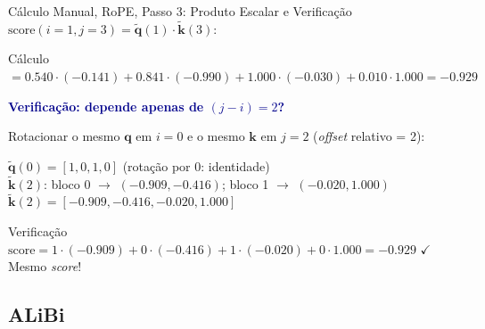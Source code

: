 \documentclass[aspectratio=169, xcolor=dvipsnames]{beamer}
\begin{document}
  \begin{frame}{Cálculo Manual, RoPE, Passo 3: Produto Escalar e Verificação}
    $\text{score}(i{=}1, j{=}3) = \tilde{\mathbf{q}}(1) \cdot \tilde{\mathbf{k}}(3)$:

    \begin{block}{Cálculo}
      $= 0.540 \!\cdot\! ({-}0.141) + 0.841 \!\cdot\! ({-}0.990) + 1.000 \!\cdot\! ({-}0.030) + 0.010 \!\cdot\! 1.000 = \mathbf{-0.929}$
    \end{block}

    \textcolor{DarkBlue}{\textbf{Verificação: depende apenas de $(j - i) = 2$?}}

    Rotacionar o mesmo $\mathbf{q}$ em $i=0$ e o mesmo $\mathbf{k}$ em $j=2$ (\textit{offset} relativo = 2):

    \begin{exampleblock}{}
      {\small
      $\tilde{\mathbf{q}}(0) = [1, 0, 1, 0]$ \; (rotação por 0: identidade)\\[2pt]
      $\tilde{\mathbf{k}}(2)$: bloco 0 $\to$ $(-0.909, -0.416)$; \; bloco 1 $\to$ $(-0.020, 1.000)$\\[2pt]
      $\tilde{\mathbf{k}}(2) = [-0.909, -0.416, -0.020, 1.000]$}
    \end{exampleblock}

    \begin{block}{Verificação}
      $\text{score} = 1 \!\cdot\! ({-}0.909) + 0 \!\cdot\! ({-}0.416) + 1 \!\cdot\! ({-}0.020) + 0 \!\cdot\! 1.000 = \mathbf{-0.929}$ \;\; $\checkmark$ Mesmo \textit{score}!
    \end{block}
  \end{frame}

  \subsection{ALiBi}
\end{document}
